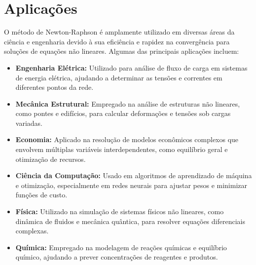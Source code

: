 \section{Aplicações}
O método de Newton-Raphson é amplamente utilizado em diversas áreas da ciência e engenharia devido à sua eficiência e rapidez na convergência para soluções de equações não lineares. Algumas das principais aplicações incluem:    
\begin{itemize}
    \item \textbf{Engenharia Elétrica:} Utilizado para análise de fluxo de carga em sistemas de energia elétrica, ajudando a determinar as tensões e correntes em diferentes pontos da rede.
    \item \textbf{Mecânica Estrutural:} Empregado na análise de estruturas não lineares, como pontes e edifícios, para calcular deformações e tensões sob cargas variadas.
    \item \textbf{Economia:} Aplicado na resolução de modelos econômicos complexos que envolvem múltiplas variáveis interdependentes, como equilíbrio geral e otimização de recursos.
    \item \textbf{Ciência da Computação:} Usado em algoritmos de aprendizado de máquina e otimização, especialmente em redes neurais para ajustar pesos e minimizar funções de custo.
    \item \textbf{Física:} Utilizado na simulação de sistemas físicos não lineares, como dinâmica de fluidos e mecânica quântica, para resolver equações diferenciais complexas.
    \item \textbf{Química:} Empregado na modelagem de reações químicas e equilíbrio químico, ajudando a prever concentrações de reagentes e produtos.
\end{itemize}

